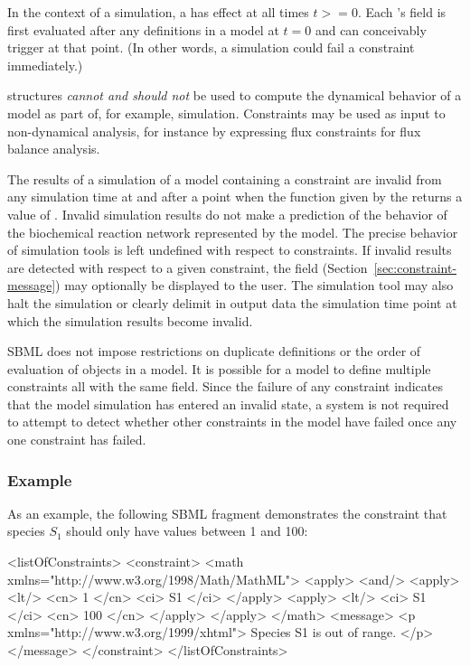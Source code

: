 In the context of a simulation, a \Constraint has effect at all
times $t >= 0$.  Each \Constraint's  field is first
evaluated after any \InitialAssignment definitions in a model at
$t = 0$ and can conceivably trigger at that point.  (In other
words, a simulation could fail a constraint immediately.)

\Constraint structures \emph{cannot and should not} be used to
compute the dynamical behavior of a model as part of, for example,
simulation.  Constraints may be used as input to non-dynamical
analysis, for instance by expressing flux constraints for flux
balance analysis.

The results of a simulation of a model containing a constraint are
invalid from any simulation time at and after a point when the
function given by the  returns a value of .
Invalid simulation results do not make a prediction of the
behavior of the biochemical reaction network represented by the
model.  The precise behavior of simulation tools is left undefined
with respect to constraints.  If invalid results are detected with
respect to a given constraint, the  field
(Section~\ref{sec:constraint-message}) may optionally be displayed
to the user.  The simulation tool may also halt the simulation or
clearly delimit in output data the simulation time point at which
the simulation results become invalid.

SBML does not impose restrictions on duplicate \Constraint
definitions or the order of evaluation of \Constraint objects in a
model.  It is possible for a model to define multiple constraints
all with the same  field.  Since the failure of any
constraint indicates that the model simulation has entered an
invalid state, a system is not required to attempt to detect
whether other constraints in the model have failed once any one
constraint has failed.


\subsubsection{Example}

As an example, the following SBML fragment demonstrates the
constraint that species $S_1$ should only have values between 1
and 100:

\begin{example}
<listOfConstraints>
    <constraint>
        <math xmlns="http://www.w3.org/1998/Math/MathML">
            <apply>
                <and/>
                <apply>
                    <lt/>
                    <cn> 1 </cn>
                    <ci> S1 </ci>
                </apply>
                <apply>
                    <lt/>
                    <ci> S1 </ci>
                    <cn> 100 </cn>
                </apply>
            </apply>
        </math>
        <message>
            <p xmlns="http://www.w3.org/1999/xhtml"> Species S1 is out of range. </p>
        </message>
    </constraint>
</listOfConstraints>
\end{example}


